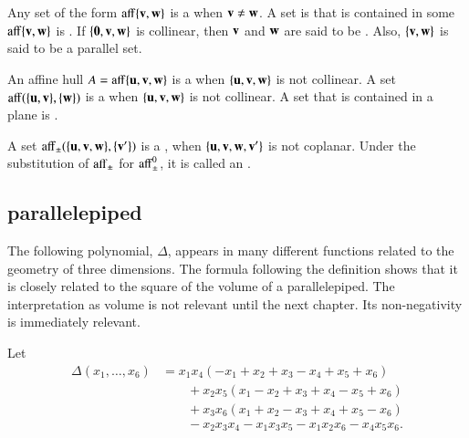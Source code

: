 	
\begin{definition}
  Any set of the form ${\operatorname{aff}}\{{\mathbf v},{\mathbf w}\}$ is a  when
  ${\mathbf v}\ne {\mathbf w}$.  A set is that is contained in some $\operatorname{aff}\{{\mathbf v},{\mathbf w}\}$ is
  .  If $\{{\mathbf 0},{\mathbf v},{\mathbf w}\}$ is collinear, then
  ${\mathbf v}$ and ${\mathbf w}$ are said to be . Also, $\{{\mathbf v},{\mathbf w}\}$
  is said to be a parallel set.
\end{definition}
%
%

\begin{definition}\label{def:plane}	
  An affine hull $A={\operatorname{aff}}\{{\mathbf u},{\mathbf v},{\mathbf w}\}$ is a  when
  $\{{\mathbf u},{\mathbf v},{\mathbf w}\}$ is not collinear.  A set ${\operatorname{aff}}(\{{\mathbf u},{\mathbf v}\},\{{\mathbf w}\})$
  is a  when $\{{\mathbf u},{\mathbf v},{\mathbf w}\}$ is not collinear. A
  set that is contained in a plane is .
\end{definition}
%
%
%
%


\begin{definition} 
A set
  ${\operatorname{aff}}_{\pm}(\{{\mathbf u},{\mathbf v},{\mathbf w}\},\{{\mathbf v}'\})$ is a ,
  when $\{{\mathbf u},{\mathbf v},{\mathbf w},{\mathbf v}'\}$ is not coplanar.  Under the substitution of
  ${\operatorname{aff}}_{\pm}$ for ${\operatorname{aff}}_{\pm}^0$, it is called an
  .
\end{definition}
%
%

\subsection{parallelepiped}\label{sec:piped}
%



The following polynomial, $\Delta$, appears in many different
functions related to the geometry of three dimensions.  The formula
following the definition shows that it is closely related to the
square of the volume of a parallelepiped.  The interpretation as
volume is not relevant until the next chapter.  Its non-negativity is
immediately relevant.  %

\begin{definition}[$\Delta$]\label{def:delta}
  Let
\begin{displaymath}
\begin{array}{lll}
\Delta(x_1,\ldots,x_6) &= x_1 x_4 (- x_1+x_2+x_3- x_4+x_5+x_6)\\
&\qquad+x_2 x_5 (x_1- x_2+x_3+x_4- x_5+x_6)\\
&\qquad+x_3 x_6 (x_1+x_2- x_3+x_4+x_5- x_6)\\
&\qquad- x_2 x_3 x_4- x_1 x_3 x_5- x_1 x_2 x_6- x_4 x_5 x_6.
\end{array}
\end{displaymath}
\end{definition}
%
%

